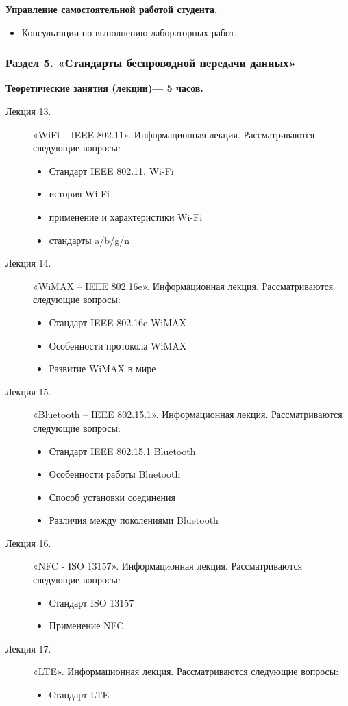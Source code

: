 \begin{center}
{\textbf{Управление самостоятельной работой студента.}
\begin{itemize}
\item Консультации по выполнению лабораторных работ.
\end{itemize}
}


\subsubsection{Раздел 5. «Стандарты беспроводной передачи данных»}

{\parindent0pt

\textbf{Теоретические занятия (лекции)— 5 часов.}
\begin{description}
\item[Лекция 13.] «WiFi -- IEEE 802.11». Информационная лекция. Рассматриваются следующие вопросы: \begin{itemize}
\item Стандарт IEEE 802.11. Wi-Fi\item история Wi-Fi\item применение и характеристики Wi-Fi\item стандарты a/b/g/n
\end{itemize}\item[Лекция 14.] «WiMAX -- IEEE 802.16e». Информационная лекция. Рассматриваются следующие вопросы: \begin{itemize}
\item Стандарт IEEE 802.16e WiMAX\item Особенности протокола WiMAX\item Развитие WiMAX в мире
\end{itemize}\item[Лекция 15.] «Bluetooth -- IEEE 802.15.1». Информационная лекция. Рассматриваются следующие вопросы: \begin{itemize}
\item Стандарт IEEE 802.15.1 Bluetooth\item Особенности работы Bluetooth\item Способ установки соединения\item Различия между поколениями Bluetooth
\end{itemize}\item[Лекция 16.] «NFC - ISO 13157». Информационная лекция. Рассматриваются следующие вопросы: \begin{itemize}
\item Стандарт ISO 13157\item Применение NFC
\end{itemize}\item[Лекция 17.] «LTE». Информационная лекция. Рассматриваются следующие вопросы: \begin{itemize}
\item Стандарт LTE
\end{itemize}
\end{description}




}
\end{center}
